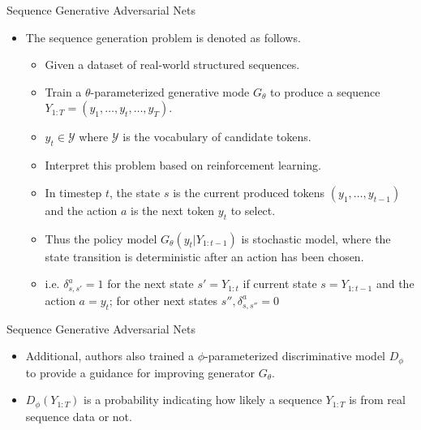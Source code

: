 \documentclass[10pt]{beamer}
\begin{document}
	\begin{frame}{Sequence Generative Adversarial Nets}
		\begin{itemize}
			\item The sequence generation problem is denoted as follows.
			\begin{itemize}
				\pause
				\item Given a dataset of real-world structured sequences.
				\pause
				\item Train a $\theta$-parameterized generative mode $G_\theta$ to produce a sequence $Y_{1:T}=(y_1,\dots,y_t,\dots,y_T)$.
				\pause
				\item $y_t\in\mathcal{Y}$ where $\mathcal{Y}$ is the vocabulary of candidate tokens.
				\pause
				\item Interpret this problem based on reinforcement learning.
				\pause
				\item In timestep $t$, the state $s$ is the current produced tokens $(y_1,\dots,y_{t-1})$ and the action $a$ is the next token $y_t$ to select.
				\pause
				\item Thus the policy model $G_\theta(y_t|Y_{1:t-1})$ is stochastic model, where the state transition is deterministic after an action has been chosen.
				\pause
				\item i.e. $\delta^a_{s,s'}=1$ for the next state $s'=Y_{1:t}$ if current state $s=Y_{1:t-1}$ and the action $a=y_t$; for other next states $s'',\delta^a_{s,s''}=0$
			\end{itemize}
		\end{itemize}
	\end{frame}

	\begin{frame}{Sequence Generative Adversarial Nets}
		\begin{itemize}
			\item Additional, authors also trained a $\phi$-parameterized discriminative model $D_\phi$ to provide a guidance for improving generator $G_\theta$.
			\pause
			\item $D_\phi(Y_{1:T})$ is a probability indicating how likely a sequence $Y_{1:T}$ is from real sequence data or not.
		\end{itemize}
	\end{frame}
\end{document}
